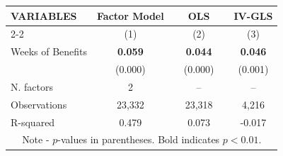 \begin{tabular}{lccccc} \hline
    VARIABLES & Factor Model &&  OLS &&  IV-GLS \\ \cline{2-2} \cline{4-4} \cline{6-6}
    				  & (1) && (2) && (3) \\ \hline
Weeks of  Benefits & \bf{0.059} && \bf{0.044} && \bf{0.046} \\
									 & (0.000)	  && (0.000)	 	 &&  (0.001)\\

N. factors   & 2 && -- && --   \\
Observations & 23,332 && 23,318 && 4,216  \\
R-squared    & 0.479 && 0.073 && -0.017  \\ \hline
\multicolumn{6}{c}{\footnotesize Note - $p$-values in parentheses. Bold indicates $p<0.01$.} \\
\end{tabular}
